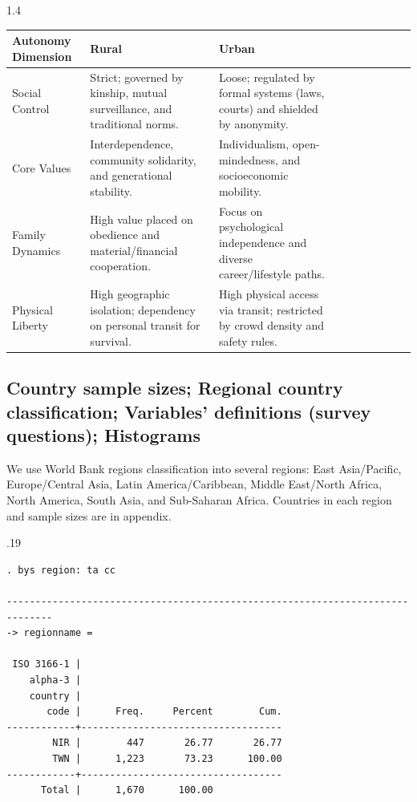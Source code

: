 \documentclass[10pt, letterpaper]{article}
\begin{document}
\begin{spacing}{1.4}
\begin{table}[!ht]
  
    \begin{tabular}{|l|l|l|l|l|l|l|l|l|l|}
    \hline
        Autonomy Dimension & Rural & Urban\\ \hline
        Social Control & Strict; governed by kinship, mutual surveillance, and traditional norms. & Loose; regulated by formal systems (laws, courts) and shielded by anonymity.\\ \hline
        Core Values & Interdependence, community solidarity, and generational stability. & Individualism, open-mindedness, and socioeconomic mobility.\\ \hline
        Family Dynamics & High value placed on obedience and material/financial cooperation. & Focus on psychological independence and diverse career/lifestyle paths.\\ \hline
        Physical Liberty & High geographic isolation; dependency on personal transit for survival. & High physical access via transit; restricted by crowd density and safety rules.\\ \hline
    \end{tabular}
\end{table}



\subsection{Country sample sizes; Regional country classification; Variables'
  definitions (survey questions); Histograms}

We use World Bank regions classification into several regions:
 East Asia/Pacific, 
 Europe/Central Asia, 
 Latin America/Caribbean, 
 Middle East/North Africa, 
 North America, 
 South Asia, and
 Sub-Saharan Africa. Countries in each region and sample sizes are in appendix.


\begin{scriptsize}
\begin{spacing}{.19} 
\begin{verbatim}
. bys region: ta cc

------------------------------------------------------------------------------
-> regionname = 

 ISO 3166-1 |
    alpha-3 |
    country |
       code |      Freq.     Percent        Cum.
------------+-----------------------------------
        NIR |        447       26.77       26.77
        TWN |      1,223       73.23      100.00
------------+-----------------------------------
      Total |      1,670      100.00


\end{verbatim}
\end{spacing}
\end{scriptsize}
\end{spacing}
\end{document}
